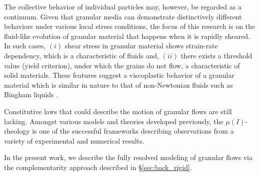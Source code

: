 The collective behavior of individual particles may, however, be regarded as a continuum. Given that granular media can demonstrate distinctively different behaviors under various local stress conditions, the focus of this research is on the fluid-like evolution of granular material that happens when it is rapidly sheared. In such cases, $(i)$ shear stress in granular material shows strain-rate dependency, which is a characteristic of fluids and, $(ii)$ there exists a threshold value (yield criterion), under which the grains do not flow, a characteristic of solid materials. These features suggest a viscoplastic behavior of a granular material which is similar in nature to that of non-Newtonian fluids such as Bingham liquids \cite{jop2006constitutiveNature,campbell1990rapid}. 

Constitutive laws that could describe the motion of granular flows are still lacking. Amongst various models and theories developed previously, the $\mu(I)$-rheology \cite{jop2006constitutiveNature} is one of the successful frameworks describing observations from a variety of experimental and numerical results.

In the present work, we describe the fully resolved modeling of granular flows via the complementarity approach described in \S\ref{sec:back_rigid}.